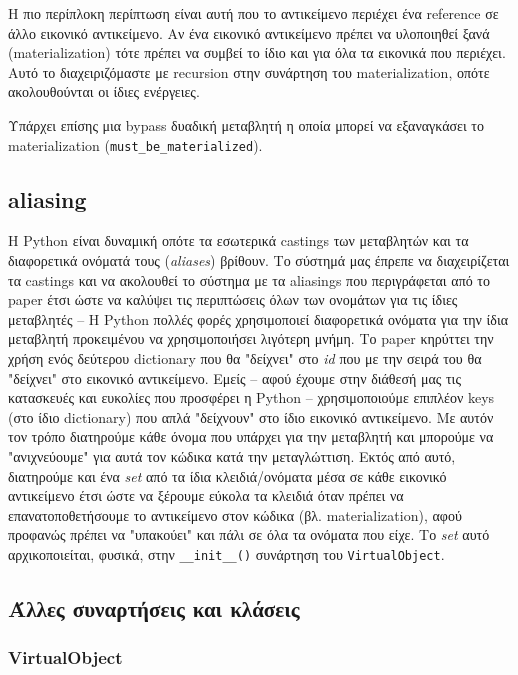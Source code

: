 Η πιο περίπλοκη περίπτωση είναι αυτή που το αντικείμενο περιέχει ένα reference
σε άλλο εικονικό αντικείμενο. Αν ένα εικονικό αντικείμενο πρέπει να υλοποιηθεί
ξανά (materialization) τότε πρέπει να συμβεί το ίδιο και για όλα τα εικονικά που
περιέχει. Αυτό το διαχειριζόμαστε με recursion στην συνάρτηση του
materialization, οπότε ακολουθούνται οι ίδιες ενέργειες.

Υπάρχει επίσης μια bypass δυαδική μεταβλητή η οποία μπορεί να εξαναγκάσει το
materialization (\texttt{must\_be\_materialized}).


\subsection{aliasing}

Η Python είναι δυναμική οπότε τα εσωτερικά castings των μεταβλητών και τα
διαφορετικά ονόματά τους (\textit{aliases}) βρίθουν. Το σύστημά μας έπρεπε να
διαχειρίζεται τα castings και να ακολουθεί το σύστημα με τα aliasings που
περιγράφεται από το paper έτσι ώστε να καλύψει τις περιπτώσεις όλων των
ονομάτων για τις ίδιες μεταβλητές – Η Python πολλές φορές χρησιμοποιεί
διαφορετικά ονόματα για την ίδια μεταβλητή προκειμένου να χρησιμοποιήσει
λιγότερη μνήμη. Το paper κηρύττει την χρήση ενός δεύτερου dictionary που θα
"δείχνει" στο \textit{id} που με την σειρά του θα "δείχνει" στο εικονικό
αντικείμενο. Εμείς – αφού έχουμε στην διάθεσή μας τις κατασκευές και ευκολίες
που προσφέρει η Python – χρησιμοποιούμε επιπλέον keys (στο ίδιο dictionary)
που απλά "δείχνουν" στο ίδιο εικονικό αντικείμενο. Με αυτόν τον τρόπο
διατηρούμε κάθε όνομα που υπάρχει για την μεταβλητή και μπορούμε να
"ανιχνεύουμε" για αυτά τον κώδικα κατά την μεταγλώττιση. Εκτός από αυτό,
διατηρούμε και ένα \textit{set} από τα ίδια κλειδιά/ονόματα μέσα σε κάθε
εικονικό αντικείμενο έτσι ώστε να ξέρουμε εύκολα τα κλειδιά όταν πρέπει να
επανατοποθετήσουμε το αντικείμενο στον κώδικα (βλ. materialization), αφού
προφανώς πρέπει να "υπακούει" και πάλι σε όλα τα ονόματα που είχε. Το
\textit{set} αυτό αρχικοποιείται, φυσικά, στην \texttt{\_\_init\_\_()}
συνάρτηση του \texttt{VirtualObject}.

\subsection{Άλλες συναρτήσεις και κλάσεις}

\subsubsection{VirtualObject}

